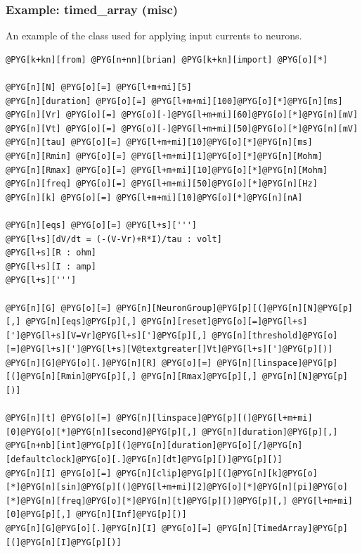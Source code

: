 \documentclass[letterpaper,10pt,english]{manual}
\begin{document}
\resetcurrentobjects
\hypertarget{--doc-examples-misc_timed_array}{}

\hypertarget{index-69}{}\subsubsection{Example: timed\_array (misc)}

An example of the \hyperlink{brian.TimedArray}{} class used for applying input currents
to neurons.

\begin{Verbatim}[commandchars=@\[\]]
@PYG[k+kn][from] @PYG[n+nn][brian] @PYG[k+kn][import] @PYG[o][*]

@PYG[n][N] @PYG[o][=] @PYG[l+m+mi][5]
@PYG[n][duration] @PYG[o][=] @PYG[l+m+mi][100]@PYG[o][*]@PYG[n][ms]
@PYG[n][Vr] @PYG[o][=] @PYG[o][-]@PYG[l+m+mi][60]@PYG[o][*]@PYG[n][mV]
@PYG[n][Vt] @PYG[o][=] @PYG[o][-]@PYG[l+m+mi][50]@PYG[o][*]@PYG[n][mV]
@PYG[n][tau] @PYG[o][=] @PYG[l+m+mi][10]@PYG[o][*]@PYG[n][ms]
@PYG[n][Rmin] @PYG[o][=] @PYG[l+m+mi][1]@PYG[o][*]@PYG[n][Mohm]
@PYG[n][Rmax] @PYG[o][=] @PYG[l+m+mi][10]@PYG[o][*]@PYG[n][Mohm]
@PYG[n][freq] @PYG[o][=] @PYG[l+m+mi][50]@PYG[o][*]@PYG[n][Hz]
@PYG[n][k] @PYG[o][=] @PYG[l+m+mi][10]@PYG[o][*]@PYG[n][nA]

@PYG[n][eqs] @PYG[o][=] @PYG[l+s][''']
@PYG[l+s][dV/dt = (-(V-Vr)+R*I)/tau : volt]
@PYG[l+s][R : ohm]
@PYG[l+s][I : amp]
@PYG[l+s][''']

@PYG[n][G] @PYG[o][=] @PYG[n][NeuronGroup]@PYG[p][(]@PYG[n][N]@PYG[p][,] @PYG[n][eqs]@PYG[p][,] @PYG[n][reset]@PYG[o][=]@PYG[l+s][']@PYG[l+s][V=Vr]@PYG[l+s][']@PYG[p][,] @PYG[n][threshold]@PYG[o][=]@PYG[l+s][']@PYG[l+s][V@textgreater[]Vt]@PYG[l+s][']@PYG[p][)]
@PYG[n][G]@PYG[o][.]@PYG[n][R] @PYG[o][=] @PYG[n][linspace]@PYG[p][(]@PYG[n][Rmin]@PYG[p][,] @PYG[n][Rmax]@PYG[p][,] @PYG[n][N]@PYG[p][)]

@PYG[n][t] @PYG[o][=] @PYG[n][linspace]@PYG[p][(]@PYG[l+m+mi][0]@PYG[o][*]@PYG[n][second]@PYG[p][,] @PYG[n][duration]@PYG[p][,] @PYG[n+nb][int]@PYG[p][(]@PYG[n][duration]@PYG[o][/]@PYG[n][defaultclock]@PYG[o][.]@PYG[n][dt]@PYG[p][)]@PYG[p][)]
@PYG[n][I] @PYG[o][=] @PYG[n][clip]@PYG[p][(]@PYG[n][k]@PYG[o][*]@PYG[n][sin]@PYG[p][(]@PYG[l+m+mi][2]@PYG[o][*]@PYG[n][pi]@PYG[o][*]@PYG[n][freq]@PYG[o][*]@PYG[n][t]@PYG[p][)]@PYG[p][,] @PYG[l+m+mi][0]@PYG[p][,] @PYG[n][Inf]@PYG[p][)]
@PYG[n][G]@PYG[o][.]@PYG[n][I] @PYG[o][=] @PYG[n][TimedArray]@PYG[p][(]@PYG[n][I]@PYG[p][)]


\end{Verbatim}
\end{document}
